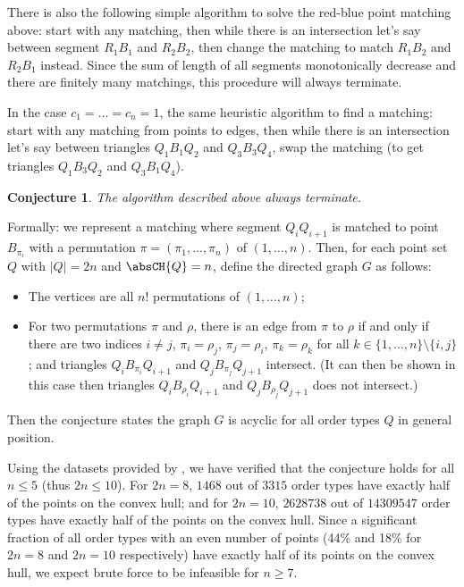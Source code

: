 \documentclass{article}
\theoremstyle{plain}
\newtheorem{conjecture}       {Conjecture}    [section]
\begin{document}
There is also the following simple algorithm to solve the red-blue point matching above:
start with any matching, then while there is an intersection let's say between segment $R_1 B_1$
and $R_2 B_2$, then change the matching to match $R_1 B_2$ and $R_2 B_1$ instead.
Since the sum of length of all segments monotonically decrease and there are finitely many matchings,
this procedure will always terminate.

In the case $c_1 = \dots = c_n = 1$,
the same heuristic algorithm to find a matching:
start with any matching from points to edges, then while there is an intersection
let's say between triangles $Q_1 B_1 Q_2$ and $Q_3 B_3 Q_4$,
swap the matching (to get triangles $Q_1 B_3 Q_2$ and $Q_3 B_1 Q_4$).

\begin{conjecture}
	The algorithm described above always terminate.
\end{conjecture}

Formally: we represent a matching
where segment $Q_i Q_{i+1}$ is matched to point $B_{\pi_i}$
with a permutation $\pi = (\pi_1, \dots, \pi_n)$ of $(1, \dots, n)$.
Then, for each point set $Q$ with $|Q|=2n$ and $\absCH{Q}=n$, define the directed graph $G$ as follows:
\begin{itemize}
	\item The vertices are all $n!$ permutations of $(1, \dots, n)$;
	\item For two permutations $\pi$ and $\rho$, there is an edge from $\pi$ to $\rho$ if and only if
		there are two indices $i\neq j$, $\pi_i = \rho_j$, $\pi_j = \rho_i$, $\pi_k = \rho_k$
		for all $k \in \{ 1, \dots, n \} \setminus \{ i, j \}$;
		and triangles $Q_i B_{\pi_i} Q_{i+1}$ and $Q_j B_{\pi_j} Q_{j+1}$ intersect.
		(It can then be shown in this case then
		triangles $Q_i B_{\rho_i} Q_{i+1}$ and $Q_j B_{\rho_j} Q_{j+1}$ does not intersect.)
\end{itemize}
Then the conjecture states the graph $G$ is acyclic for all order types $Q$ in general position.

Using the datasets provided by \cite{Aichholzer_2001}, we have verified that the conjecture holds for all $n \leq 5$
(thus $2n \leq 10$). For $2n = 8$, $1468$ out of $3315$ order types have exactly half of the points on the convex hull;
and for $2n = 10$, $2628738$ out of $14309547$ order types have exactly half of the points on the convex hull.
Since a significant fraction of all order types with an even number of points (44\% and 18\% for $2n=8$ and $2n=10$ respectively) have exactly half of its points on the convex hull,
we expect brute force to be infeasible for $n \geq 7$.
\end{document}

